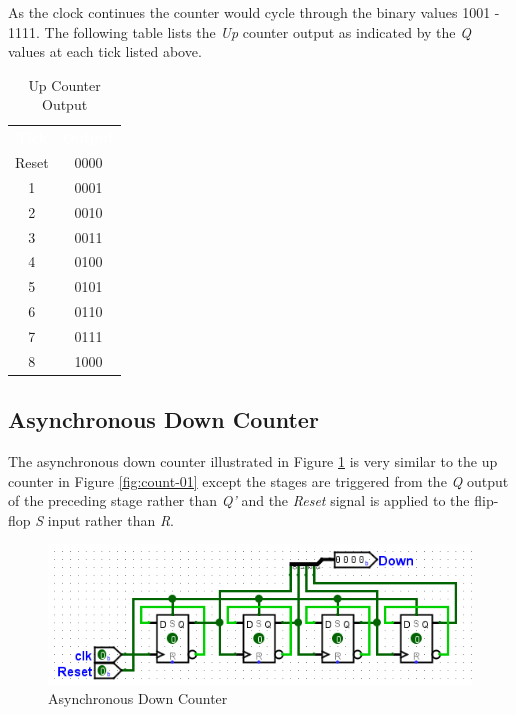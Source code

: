 As the clock continues the counter would cycle through the binary values 1001 - 1111. The following table lists the \textit{Up} counter output as indicated by the \textit{Q} values at each tick listed above.

\begin{table}[H]
	\sffamily
	\newcommand{\head}[1]{\textcolor{white}{\textbf{#1}}}		
	\begin{center}
		\begin{tabular}{cc} 
			\rowcolor{black!75}
			\head{Tick} & \head{Output} \\
			Reset & 0000 \\
			1 & 0001 \\
			2 & 0010 \\
			3 & 0011 \\
			4 & 0100 \\
			5 & 0101 \\
			6 & 0110 \\
			7 & 0111 \\
			8 & 1000
		\end{tabular}
	\end{center}
	\caption{Up Counter Output}
	\label{tab0601}
\end{table}

\subsection{Asynchronous Down Counter}

The asynchronous down counter illustrated in Figure \ref{fig:count-02} is very similar to the up counter in Figure \ref{fig:count-01} except the stages are triggered from the \textit{Q} output of the preceding stage rather than \textit{Q'} and the \textit{Reset} signal is applied to the flip-flop \textit{S} input rather than \textit{R}.

\begin{figure}[H]
	\centering
	\includegraphics[width=\maxwidth{.95\linewidth}]{gfx/count-02}
	\caption{Asynchronous Down Counter}
	\label{fig:count-02}
\end{figure}

